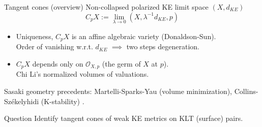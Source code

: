 \documentclass{beamer}
\begin{document}
\begin{frame}{Tangent cones (overview)}
	Non-collapsed polarized KE limit space \((X, d_{KE})\)
	\[C_p X := \lim_{\lambda \to 0} (X, \lambda^{-1}d_{KE},p)\]
	\begin{itemize}
		\item Uniqueness, \(C_pX\) is an affine algebraic variety (Donaldson-Sun).\\
		Order of vanishing w.r.t. \(d_{KE}\) \(\implies\) two steps degeneration.
		\item \(C_pX\) depends only on \(\mathcal{O}_{X,p}\) (the germ of \(X\) at \(p\)). \\
		Chi Li's normalized volumes of valuations.
	\end{itemize}
	
	Sasaki geometry precedents: Martelli-Sparks-Yau (volume minimization),
	Collins-Sz\'ekelyhidi (K-stability) .
	\begin{block}{Question}
		Identify tangent cones of weak KE metrics on KLT (surface) pairs.
	\end{block}
\end{frame}
\end{document}
